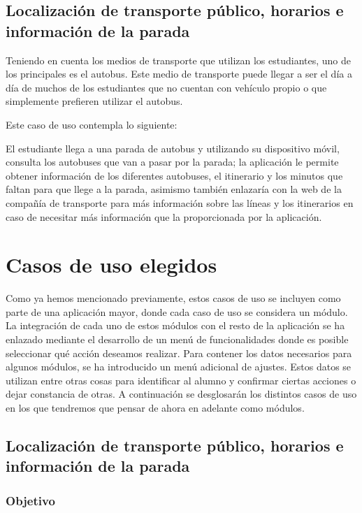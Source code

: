\subsection{Localización de transporte público, horarios e información de la parada}

Teniendo en cuenta los medios de transporte que utilizan los estudiantes, uno de los principales es el autobus. Este medio de transporte puede llegar a ser el día a día de muchos de los estudiantes que no cuentan con vehículo propio o que simplemente prefieren utilizar el autobus. 

Este caso de uso contempla lo siguiente: 


El estudiante llega a una parada de autobus y utilizando su dispositivo móvil, consulta los autobuses que van a pasar por la parada; la aplicación le permite obtener información de los diferentes autobuses, el itinerario y los minutos que faltan para que llege a la parada, asimismo también enlazaría con la web de la compañía de transporte para más información sobre las líneas y los itinerarios en caso de necesitar más información que la proporcionada por la aplicación.

\section{Casos de uso elegidos}

Como ya hemos mencionado previamente, estos casos de uso se incluyen como parte de una aplicación mayor, donde cada caso de uso se considera un módulo. La integración de cada uno de estos módulos con el resto de la aplicación se ha enlazado mediante el desarrollo de un menú de funcionalidades donde es posible seleccionar qué acción deseamos realizar. Para contener los datos necesarios para algunos módulos, se ha introducido un menú adicional de ajustes. Estos datos se utilizan entre otras cosas para identificar al alumno y confirmar ciertas acciones o dejar constancia de otras. A continuación se desglosarán los distintos casos de uso en los que tendremos que pensar de ahora en adelante como módulos.

\subsection{Localización de transporte público, horarios e información de la parada}

\subsubsection{Objetivo}


